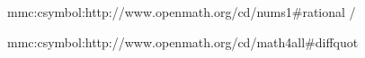 

\unprotect


\startsetups mmc:csymbol:http://www.openmath.org/cd/nums1\string#rational
    \MMLcreset
    \getXMLstackdata\plustwo/\getXMLstackdata\plusthree
\stopsetups


\startsetups mmc:csymbol:http://www.openmath.org/cd/math4all\string#diffquot
    \MMLcreset
    \frac {
        \Delta\getXMLstackdata\plustwo
    } {
        \Delta\getXMLstackdata\plusthree
    }
\stopsetups


